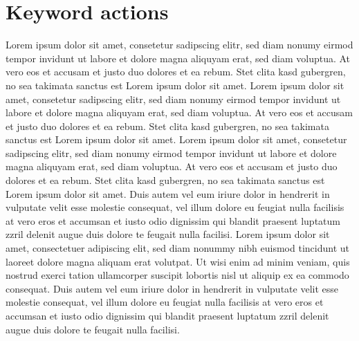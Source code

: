	\section{Keyword actions}
Lorem ipsum dolor sit amet, consetetur sadipscing elitr, sed diam nonumy eirmod tempor invidunt ut
labore et dolore magna aliquyam erat, sed diam voluptua. At vero eos et accusam et justo duo dolores
et ea rebum. Stet clita kasd gubergren, no sea takimata sanctus est Lorem ipsum dolor sit amet. Lorem
ipsum dolor sit amet, consetetur sadipscing elitr, sed diam nonumy eirmod tempor invidunt ut labore
et dolore magna aliquyam erat, sed diam voluptua. At vero eos et accusam et justo duo dolores et ea
rebum. Stet clita kasd gubergren, no sea takimata sanctus est Lorem ipsum dolor sit amet. Lorem ipsum
dolor sit amet, consetetur sadipscing elitr, sed diam nonumy eirmod tempor invidunt ut labore et dolore
magna aliquyam erat, sed diam voluptua. At vero eos et accusam et justo duo dolores et ea rebum. Stet
clita kasd gubergren, no sea takimata sanctus est Lorem ipsum dolor sit amet.
Duis autem vel eum iriure dolor in hendrerit in vulputate velit esse molestie consequat, vel illum dolore
eu feugiat nulla facilisis at vero eros et accumsan et iusto odio dignissim qui blandit praesent luptatum
zzril delenit augue duis dolore te feugait nulla facilisi. Lorem ipsum dolor sit amet, consectetuer adipiscing
elit, sed diam nonummy nibh euismod tincidunt ut laoreet dolore magna aliquam erat volutpat.
Ut wisi enim ad minim veniam, quis nostrud exerci tation ullamcorper suscipit lobortis nisl ut aliquip
ex ea commodo consequat. Duis autem vel eum iriure dolor in hendrerit in vulputate velit esse molestie
consequat, vel illum dolore eu feugiat nulla facilisis at vero eros et accumsan et iusto odio dignissim qui
blandit praesent luptatum zzril delenit augue duis dolore te feugait nulla facilisi.